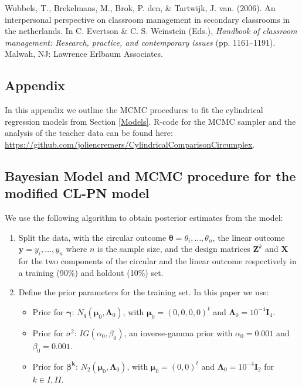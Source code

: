 \documentclass[11pt,]{article}
\begin{document}
\leavevmode\hypertarget{ref-wubbels2006interpersonal}{}%
Wubbels, T., Brekelmans, M., Brok, P. den, \& Tartwijk, J. van. (2006).
An interpersonal perspective on classroom management in secondary
classrooms in the netherlands. In C. Evertson \& C. S. Weinstein (Eds.),
\emph{Handbook of classroom management: Research, practice, and
contemporary issues} (pp. 1161--1191). Malwah, NJ: Lawrence Erlbaum
Associates.

\newpage
\begin{appendices}
\section{Appendix}\label{Appendix}

In this appendix we outline the MCMC procedures to fit the cylindrical regression models from Section \ref{Models}. R-code for the MCMC sampler and the analysis of the teacher data can be found here: \url{https://github.com/joliencremers/CylindricalComparisonCircumplex}.

\subsection{Bayesian Model and MCMC procedure for the modified CL-PN model}\label{A1}

We use the following algorithm to obtain posterior estimates from the model:

\begin{enumerate}

\item Split the data, with the circular outcome $\boldsymbol{\theta} = \theta_i, \dots, \theta_n$, the linear outcome $\boldsymbol{y} = y_i, \dots, y_n$ where $n$ is the sample size, and the design matrices $\boldsymbol{Z}^k$ and $\boldsymbol{X}$ for the two components of the circular and the linear outcome respectively in a training (90\%) and holdout (10\%) set.

\item Define the prior parameters for the training set. In this paper we use:

\begin{itemize}
\item Prior for $\boldsymbol{\gamma}$: $N_q(\boldsymbol{\mu}_{0}, \boldsymbol{\Lambda}_{0})$, with  $\boldsymbol{\mu}_{0} = (0,0,0,0)^t$ and  $\boldsymbol{\Lambda}_{0} = 10^{-4}\boldsymbol{I}_4$.
\item Prior for $\sigma^2$: $IG(\alpha_{0}, \beta_{0})$, an inverse-gamma prior with $\alpha_{0} = 0.001$ and  $\beta_{0} = 0.001$.
\item Prior for $\boldsymbol{\beta^{k}}$: $N_2(\boldsymbol{\mu}_{0}, \boldsymbol{\Lambda}_{0})$, with $\boldsymbol{\mu}_{0} = (0,0)^t$ and  $\boldsymbol{\Lambda}_{0} = 10^{-4}\boldsymbol{I}_2$ for $k \in I,II$.
\end{itemize}


\end{enumerate}
\end{appendices}
\end{document}
